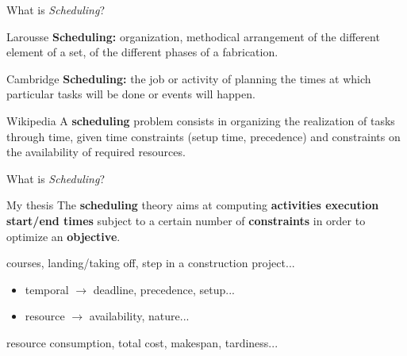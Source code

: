 \begin{frame}{What is {\it Scheduling}?}
  \vfill
  \begin{block}{Larousse}
    {\bf \color{bleuLAAS} Scheduling: }organization, methodical arrangement of the different
    element of a set, of the  different phases of a fabrication.
  \end{block}
  \vfill
\pause
  \begin{block}{Cambridge}
    {\bf  \color{bleuLAAS}  Scheduling: }the job or activity of planning the times at which particular tasks will be done or events will happen.
  \end{block}
  \vfill  
\pause
  \begin{block}{Wikipedia}
    A {\bf  \color{bleuLAAS}  scheduling} problem consists in organizing the realization of
    tasks through time, given time constraints (setup time, precedence)
    and constraints on the availability of required resources.
  \end{block}
  \vfill
\end{frame}

\begin{frame}{What is {\it Scheduling}?}
\vspace{0.3cm}
  \begin{block}{My thesis}
    The {\bf  \color{bleuLAAS} scheduling} theory aims at computing {\bf activities execution
      start/end times} subject to a certain number of {\bf
      constraints} in order to optimize an {\bf objective}.    
  \end{block}
  \vspace{0.6cm}
  \begin{description}
\pause
  \item[activities :]  courses, landing/taking off, step in a
    construction project... 
    \vspace{0.2cm}
\pause
  \item[constraints :]
    \begin{itemize}
    \item temporal $\rightarrow$ deadline, precedence, setup...
    \item resource $\rightarrow$ availability, nature... 
    \end{itemize}
\pause
    \vspace{0.2cm}
  \item[objective :] resource consumption, total cost, makespan,
    tardiness... 
    \vspace{0.2cm}
  \end{description}
\end{frame}

